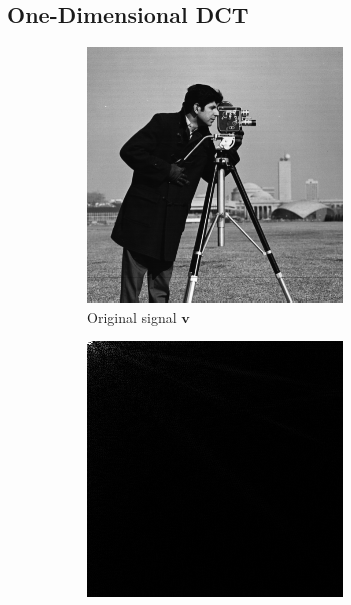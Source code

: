 \subsection{One-Dimensional DCT}
\begin{figure}
  \centering
  \begin{subfigure}{0.45\textwidth}
    \centering
    \includegraphics[width=\textwidth]{Chapter3/Images/cameraman.png}
    \caption{Original signal $\bm v$}
  \end{subfigure}
  \begin{subfigure}{0.45\textwidth}
    \centering
    \includegraphics[width=\textwidth]{Chapter3/Images/dctCoeff.png}

\end{subfigure}
\end{figure}
